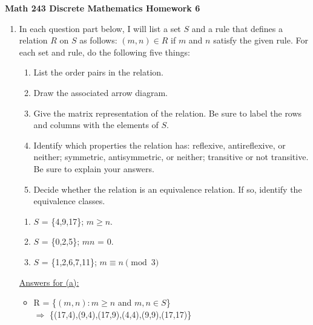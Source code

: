 \documentclass{article}
\begin{document}
\noindent\textbf{Math 243 Discrete Mathematics \hfill Homework 6}

\begin{enumerate}
    \item In each question part below, I will list a set $\mathit{S}$ and 
    a rule that defines a relation $\mathit{R}$ on $\mathit{S}$ as follows: 
    $(\mathit{m,n}) \in R$ if $\mathit{m}$ and $\mathit{n}$ satisfy the given rule. 
    For each set and rule, do the following five things: 
\begin{enumerate}[label=\bfseries \roman*]
\item List the order pairs in the relation.
\item Draw the associated arrow diagram.
\item Give the matrix representation of the relation. 
Be sure to label the rows and columns with the elements of $S$.
\item Identify which properties the relation has: reflexive, 
antireflexive, or neither; symmetric, antisymmetric, or neither; 
transitive or not transitive. Be sure to explain your answers.
\item Decide whether the relation is an equivalence relation. 
If so, identify the equivalence classes.     
\end{enumerate}

\begin{enumerate}
    \item $\mathit{S}$ = \{4,9,17\}; $m \geq n$.    
    \item $\mathit{S}$ = \{0,2,5\}; $mn$ = 0.
    \item $\mathit{S}$ = \{1,2,6,7,11\}; $m \equiv n \pmod{3}$
\end{enumerate}

\small
\underline{Answers for (a):}    

\begin{itemize}
    \item R = \{$(m,n):m \geq n$ and $m,n \in S$\}
    \\$\Rightarrow$ \{(17,4),(9,4),(17,9),(4,4),(9,9),(17,17)\}\\
   
\end{itemize}
\end{enumerate}
\end{document}
